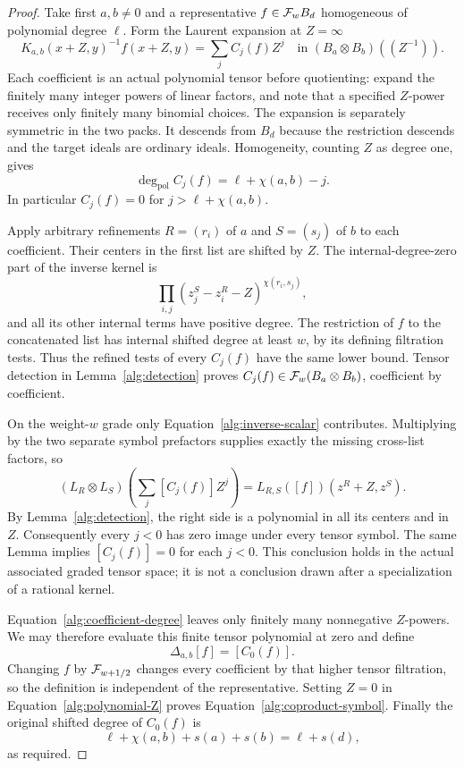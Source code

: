 \begin{proof}
Take first $a,b\ne0$ and a representative
$f\in\mathcal F_wB_d$ homogeneous of polynomial degree $\ell$.  Form the
Laurent expansion at $Z=\infty$
\begin{equation}\label{alg:separation-expansion}
 K_{a,b}(x+Z,y)^{-1}f(x+Z,y)
       =\sum_j C_j(f)Z^j
       \quad\text{in }(B_a\otimes B_b)((Z^{-1})).
\end{equation}
Each coefficient is an actual polynomial tensor before quotienting:
expand the finitely many integer powers of linear factors, and note
that a specified $Z$-power receives only finitely many binomial
choices.  The expansion is separately symmetric in the two packs.
It descends from $B_d$ because the restriction descends and the target
ideals are ordinary ideals.  Homogeneity, counting $Z$ as degree one,
gives
\begin{equation}\label{alg:coefficient-degree}
 \deg_{\mathrm{pol}}C_j(f)=\ell+\chi(a,b)-j.
\end{equation}
In particular $C_j(f)=0$ for $j>\ell+\chi(a,b)$.

Apply arbitrary refinements $R=(r_i)$ of $a$ and $S=(s_j)$ of $b$ to
each coefficient.  Their centers in the first list are shifted by
$Z$.  The internal-degree-zero part of the inverse kernel is
\begin{equation}\label{alg:inverse-scalar}
 \prod_{i,j}(z_j^S-z_i^R-Z)^{\chi(r_i,s_j)},
\end{equation}
and all its other internal terms have positive degree.  The
restriction of $f$ to the concatenated list has internal shifted
degree at least $w$, by its defining filtration tests.  Thus the
refined tests of every $C_j(f)$ have the same lower bound.  Tensor
detection in Lemma~\ref{alg:detection} proves
$C_j(f)\in\mathcal F_w(B_a\otimes B_b)$, coefficient by coefficient.

On the weight-$w$ grade only Equation~\eqref{alg:inverse-scalar}
contributes.  Multiplying by the two separate symbol prefactors
supplies exactly the missing cross-list factors, so
\begin{equation}\label{alg:polynomial-Z}
 (L_R\otimes L_S)
       \left(\sum_j[C_j(f)]Z^j\right)
   =L_{R,S}([f])(z^R+Z,z^S).
\end{equation}
By Lemma~\ref{alg:detection}, the right side is a polynomial in all
its centers and in $Z$.  Consequently every $j<0$ has zero image
under every tensor symbol.  The same Lemma implies
$[C_j(f)]=0$ for each $j<0$.  This conclusion holds in the actual
associated graded tensor space; it is not a conclusion drawn after
a specialization of a rational kernel.

Equation~\eqref{alg:coefficient-degree} leaves only finitely many
nonnegative $Z$-powers.  We may therefore evaluate this finite tensor
polynomial at zero and define
\[
 \Delta_{a,b}[f]=[C_0(f)].
\]
Changing $f$ by $\mathcal F_{w+1/2}$ changes every coefficient by that higher
tensor filtration, so the definition is independent of the
representative.  Setting $Z=0$ in
Equation~\eqref{alg:polynomial-Z} proves
Equation~\eqref{alg:coproduct-symbol}.  Finally the original shifted
degree of $C_0(f)$ is
\[
 \ell+\chi(a,b)+s(a)+s(b)=\ell+s(d),
\]
as required.
\end{proof}

